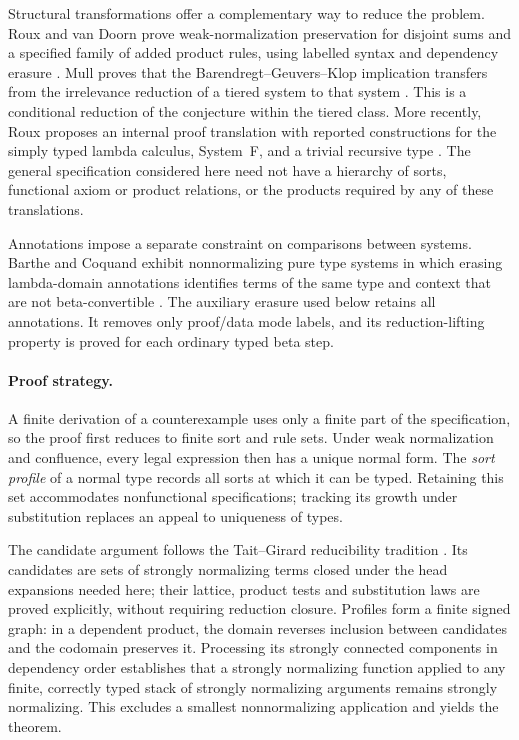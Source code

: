 Structural transformations offer a complementary way to reduce the
problem. Roux and van Doorn prove weak-normalization preservation for
disjoint sums and a specified family of added product rules, using
labelled syntax and dependency erasure
\cite[Sections~3--4]{RouxVanDoorn2014}. Mull proves that the
Barendregt--Geuvers--Klop implication transfers from the irrelevance
reduction of a tiered system to that system
\cite[Theorem~47]{Mull2023}. This is a conditional reduction of the
conjecture within the tiered class. More recently, Roux proposes an
internal proof translation with reported constructions for the simply
typed lambda calculus, System~F, and a trivial recursive type
\cite[slides~16--17]{Roux2025}. The general specification considered here
need not have a hierarchy of sorts, functional axiom or product relations,
or the products required by any of these translations.

Annotations impose a separate constraint on comparisons between systems.
Barthe and Coquand exhibit nonnormalizing pure type systems in which
erasing lambda-domain annotations identifies terms of the same type and
context that are not beta-convertible
\cite[Theorem~17]{BartheCoquand2006}. The auxiliary erasure used below
retains all annotations. It removes only proof/data mode labels, and its
reduction-lifting property is proved for each ordinary typed beta step.

\paragraph{Proof strategy.}
A finite derivation of a counterexample uses only a finite part of the
specification, so the proof first reduces to finite sort and rule sets.
Under weak normalization and confluence, every legal expression then has
a unique normal form. The \emph{sort profile} of a normal type records
all sorts at which it can be typed. Retaining this set accommodates
nonfunctional specifications; tracking its growth under substitution
replaces an appeal to uniqueness of types.

The candidate argument follows the Tait--Girard reducibility tradition
\cite[Chapters~6 and~14]{Girard1989}. Its candidates are sets of strongly
normalizing terms closed under the head expansions needed here; their
lattice, product tests and substitution laws are proved explicitly,
without requiring reduction closure. Profiles form a finite signed graph:
in a dependent product, the domain reverses inclusion between candidates
and the codomain preserves it. Processing its strongly connected
components in dependency order establishes that a strongly normalizing
function applied to any finite, correctly typed stack of strongly
normalizing arguments remains strongly normalizing. This excludes a
smallest nonnormalizing application and yields the theorem.

